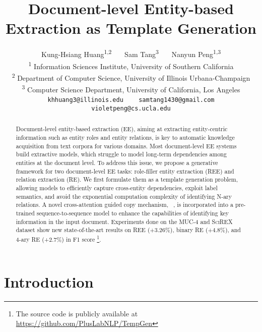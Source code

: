 \documentclass[11pt]{article}
\title{Document-level Entity-based Extraction as Template Generation}
\author{Kung-Hsiang Huang\textsuperscript{\rm 1,2}~~~
    Sam Tang\textsuperscript{\rm 3}~~~
    Nanyun Peng\textsuperscript{\rm 1,3}\\
    \textsuperscript{\rm 1} Information Sciences Institute, University of Southern California\\
    \textsuperscript{\rm 2} Department of Computer Science, University of Illinois Urbana-Champaign\\
    \textsuperscript{\rm 3} Computer Science Department, University of California, Los Angeles \\
    {\tt khhuang3@illinois.edu} ~~~
    {\tt samtang1430@gmail.com} \\
    {\tt violetpeng@cs.ucla.edu}  \\}
\begin{document}
\maketitle
\newcommand{\SideNote}[2]{\todo[color=#1,size=\small]{#2}} 
\newcommand{\ssteeve}[1]{\SideNote{orange!40}{#1 --steeve}}
\newcommand{\sam}[1]{\SideNote{green!40}{#1 --sam}}
\newcommand{\violet}[1]{\SideNote{purple!40}{#1 --violet}}
\newcommand{\Steeve}[1]{{\color{orange}#1}}
\newcommand{\modelshort}[1]{\textsc{TempGen}}
\newcommand{\modellong}[1]{Cross-attention Guided Template Generation}
\newcommand{\perpind}[1]{\textsc{PerpInd}}
\newcommand{\perporg}[1]{\textsc{PerpOrg}}
\newcommand{\target}[1]{\textsc{Target}}
\newcommand{\victim}[1]{\textsc{Victim}}
\newcommand{\weapon}[1]{\textsc{Weapon}}
\newcommand{\dygiepp}[1]{\textsc{DyGIE++}}
\newcommand{\scirexpipeline}[1]{\textsc{SciREX-P}}
\newcommand{\topkcopy}[1]{\textsc{TopK Copy}}
\newlength{\Width}\newlength{\DepthReference}
\newlength{\HeightReference}
\newcommand{\MyColorBox}[2][red]{\settowidth{\Width}{#2}\colorbox{#1}{\raisebox{-\DepthReference}{\parbox[b][\HeightReference+\DepthReference][c]{\Width}{\centering#2}}}}
\setlength{\fboxsep}{1pt}

\begin{abstract}
    Document-level entity-based extraction (EE), aiming at extracting entity-centric information such as entity roles and entity relations, is key to automatic knowledge acquisition from text corpora for various domains. 
    Most document-level EE systems build extractive models, which struggle to model long-term dependencies among entities at the document level. 
    To address this issue, we propose a generative framework for two document-level EE tasks: role-filler entity extraction (REE) and relation extraction (RE). 
     We first formulate them as a template generation problem, allowing models to efficiently capture cross-entity dependencies, exploit label semantics, and avoid the exponential computation complexity of identifying N-ary relations. A novel cross-attention guided copy mechanism, \topkcopy~, is incorporated into a pre-trained sequence-to-sequence model to enhance the capabilities of identifying key information in the input document. Experiments done on the MUC-4 and \textsc{SciREX} dataset show new state-of-the-art results on REE (+3.26\%), binary RE (+4.8\%), and 4-ary RE (+2.7\%) in F1 score \footnote{The source code is publicly available at \url{https://github.com/PlusLabNLP/TempGen}}. 
\end{abstract}  \section{Introduction}
\end{document}
